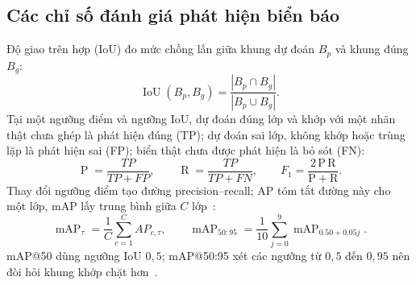 \subsection{Các chỉ số đánh giá phát hiện biển báo}
\label{sec:detection_metrics}
Độ giao trên hợp (IoU) đo mức chồng lấn giữa khung dự đoán $B_p$ và khung đúng $B_g$:
\begin{equation}
 \operatorname{IoU}(B_p,B_g)=\frac{|B_p\cap B_g|}{|B_p\cup B_g|}.
 \label{eq:iou}
\end{equation}
Tại một ngưỡng điểm và ngưỡng IoU, dự đoán đúng lớp và khớp với một nhãn thật chưa ghép là phát hiện đúng (TP); dự đoán sai lớp, không khớp hoặc trùng lặp là phát hiện sai (FP); biển thật chưa được phát hiện là bỏ sót (FN):
\begin{equation}
 \operatorname{P}=\frac{TP}{TP+FP},\qquad
 \operatorname{R}=\frac{TP}{TP+FN},\qquad
 F_1=\frac{2\,\mathrm{P}\,\mathrm{R}}{\mathrm{P}+\mathrm{R}}.
 \label{eq:precision_recall}
\end{equation}
Thay đổi ngưỡng điểm tạo đường precision--recall; AP tóm tắt đường này cho một lớp, mAP lấy trung bình giữa $C$ lớp~\cite{tailieu_bai9}:
\begin{equation}
 \operatorname{mAP}_{\tau}=\frac{1}{C}\sum_{c=1}^{C}AP_{c,\tau},\qquad
 \operatorname{mAP}_{50:95}=\frac{1}{10}\sum_{j=0}^{9}\operatorname{mAP}_{0.50+0.05j}.
 \label{eq:map}
\end{equation}
mAP@50 dùng ngưỡng IoU $0{,}5$; mAP@50:95 xét các ngưỡng từ $0{,}5$ đến $0{,}95$ nên đòi hỏi khung khớp chặt hơn~\cite{coco_evaluation,ultralytics_metrics}.

